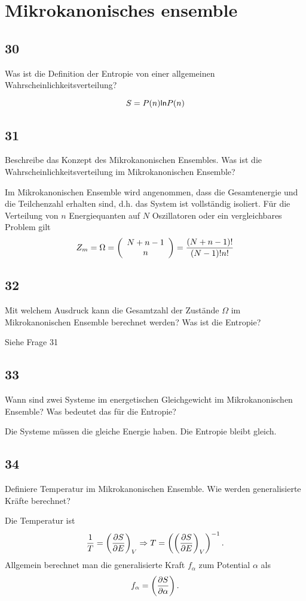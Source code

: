 \section{Mikrokanonisches ensemble}
\subsection{30}
\begin{myfrag}
Was ist die Definition der Entropie von einer allgemeinen Wahrscheinlichkeitsverteilung?
\end{myfrag}
\begin{equation}
	S=P(n)\mathsf{ln} P(n)
\end{equation}
\subsection{31}
\begin{myfrag}
Beschreibe das Konzept des Mikrokanonischen Ensembles. Was ist die
Wahrscheinlichkeitsverteilung im Mikrokanonischen Ensemble?
\end{myfrag}
Im Mikrokanonischen Ensemble wird angenommen, dass die Gesamtenergie und die Teilchenzahl erhalten sind, d.h. das System ist vollständig isoliert. Für die Verteilung von $n$ Energiequanten auf $N$ Oszillatoren oder ein vergleichbares Problem gilt
\begin{equation}
	Z_m=\Omega=\left(\begin{array}{c}{N+n-1}\\{n}\end{array}\right)=\frac{(N+n-1)!}{(N-1)!n!}
\end{equation}
\subsection{32}
\begin{myfrag}
Mit welchem Ausdruck kann die Gesamtzahl der Zustände $\Omega$ im
Mikrokanonischen Ensemble berechnet werden? Was ist die Entropie?
\end{myfrag}
Siehe Frage 31 %
\subsection{33}
\begin{myfrag}
Wann sind zwei Systeme im energetischen Gleichgewicht im Mikrokanonischen
Ensemble? Was bedeutet das für die Entropie?
\end{myfrag}
Die Systeme müssen die gleiche Energie haben. Die Entropie bleibt gleich. %
\subsection{34}
\begin{myfrag}
Definiere Temperatur im Mikrokanonischen Ensemble. Wie werden
generalisierte Kräfte berechnet?
\end{myfrag}
Die Temperatur ist
\begin{equation}
	\frac{1}{T}=\left(\frac{\partial S}{\partial E}\right)_{V} \Rightarrow T=\left(\left(\frac{\partial S}{\partial E}\right)_{V}\right)^{-1}.
\end{equation}
Allgemein berechnet man die generalisierte Kraft $f_\alpha$ zum Potential $\alpha$ als
\begin{equation}
	f_\alpha=\left(\frac{\partial S}{\partial \alpha}\right) .
\end{equation}
